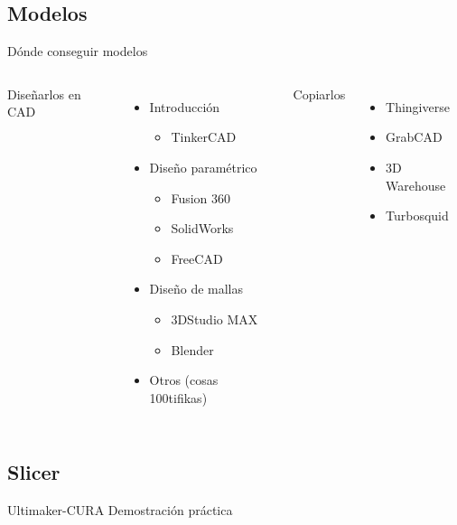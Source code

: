 \documentclass{beamer}
\begin{document}
	\subsection{Modelos}
	\begin{frame}{Dónde conseguir modelos}
		\begin{columns}[T, onlytextwidth]
			Diseñarlos en CAD
			\begin{itemize}
				\item Introducción
				\begin{itemize}
					\item TinkerCAD
				\end{itemize}
				\item Diseño paramétrico
				\begin{itemize}
					\item Fusion 360
					\item SolidWorks
					\item FreeCAD
				\end{itemize}
				\item Diseño de mallas
				\begin{itemize}
					\item 3DStudio MAX
					\item Blender
				\end{itemize}
				\item Otros (cosas 100tifikas)
			\end{itemize}
			Copiarlos
			\begin{itemize}
				\item Thingiverse
				\item GrabCAD
				\item 3D Warehouse
				\item Turbosquid
			\end{itemize}
		\end{columns}
	\end{frame}
	
	\subsection{Slicer}
	\begin{frame}[standout]{Ultimaker-CURA}
		Demostración práctica
	\end{frame}
	
\end{document}
